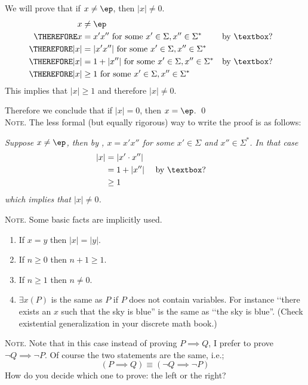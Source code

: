 We will prove that if $x \neq \ep$, then $|x| \neq 0$.
\begin{align*}
x &\neq \ep \\
\THEREFORE x &= x'x'' \text{ for some } x' \in \Sigma, x'' \in \Sigma^*
           & & \text{by \answerbox{?}} \\
\THEREFORE |x| &= |x' x''| \text{ for some } x' \in \Sigma, x'' \in \Sigma^* 
           \\ 
\THEREFORE |x| &= 1 + |x''| \text{ for some } x' \in \Sigma, x'' \in \Sigma^*
           & & \text{by \answerbox{?}} \\
\THEREFORE |x| &\geq 1 \text{ for some } x' \in \Sigma, x'' \in \Sigma^* 
\end{align*}
This implies that $|x| \geq 1$ and therefore $|x| \neq 0$.

Therefore we conclude that if $|x| = 0$, then $x = \ep$. \qed
\\

\textsc{Note.}
The less formal (but equally rigorous) way to write the proof is as follows:

\textit{
Suppose $x \neq \ep$, then by , $x = x'x''$ 
for some $x' \in \Sigma$ and $x'' \in \Sigma^*$.
In that case
\begin{align*}
|x| 
&= |x' \cdot x''| \\ 
&= 1 + |x''| & & \text{ by \answerbox{?}}    \\
&\geq 1
\end{align*}
which implies that $|x| \neq 0$.
}

\textsc{Note.}
Some basic facts are implicitly used.
\begin{enumerate}
\item If $x = y$ then $|x|= |y|$. 
\item If $n \geq 0$ then $n + 1 \geq 1$.
\item If $n \geq 1$ then $ n \neq 0$.
\item $\exists x(P)$ is the same as $P$ if
$P$ does not contain variables.
For instance \lq\lq there exists an $x$ such that
the sky is blue'' is the same as
\lq\lq the sky is blue''.
(Check existential generalization in your discrete math book.)
\end{enumerate}

\textsc{Note.}
Note that in this case instead of proving $P \implies Q$,
I prefer to prove $\lnot Q \implies \lnot P$.
Of course the two statements are the same, i.e.;
\[
(P \implies Q) \equiv (\lnot Q \implies \lnot P)
\]
How do you decide which one to prove: the left or the right?

